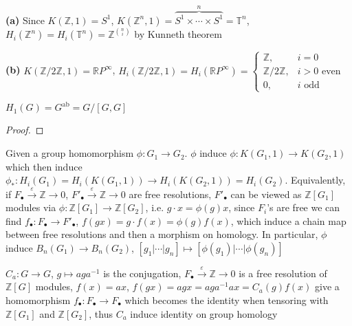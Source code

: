 \documentclass[../main.tex]{subfiles}
\begin{document}
\begin{example}
\textbf{(a) }Since $K(\mathbb Z,1)=S^1$, $K(\mathbb Z^n,1)=\overbrace{S^1\times\cdots\times S^1}^{n}=\mathbb T^n$, $H_i(\mathbb Z^n)=H_i(\mathbb T^n)=\mathbb Z^{\binom{n}{i}}$ by Kunneth theorem \par
\textbf{(b) }$K(\mathbb Z/2\mathbb Z,1)=\mathbb RP^\infty$, $H_i(\mathbb Z/2\mathbb Z,1)=H_i(\mathbb RP^\infty)=\begin{cases}
\mathbb Z, &i=0 \\
\mathbb Z/2\mathbb Z, & i>0 \text{ even} \\
0, &i\text{ odd}
\end{cases}$
\end{example}

\begin{lemma}
$H_1(G)=G^{\mathrm{ab}}=G/[G,G]$
\end{lemma}

\begin{proof}

\end{proof}

\begin{definition}
Given a group homomorphism $\phi:G_1\to G_2$. $\phi$ induce $\phi:K(G_1,1)\to K(G_2,1)$ which then induce $\phi_*:H_i(G_1)=H_i(K(G_1,1))\to H_i(K(G_2,1))=H_i(G_2)$. Equivalently, if $F_\bullet\xrightarrow{\varepsilon}\mathbb Z\to0$, $F'_\bullet\xrightarrow{\varepsilon}\mathbb Z\to0$ are free resolutions, $F'_\bullet$ can be viewed as $\mathbb Z[G_1]$ modules via $\phi:\mathbb Z[G_1]\to\mathbb Z[G_2]$, i.e. $g\cdot x=\phi(g)x$, since $F_i$'s are free we can find $f_\bullet:F_\bullet\to F'_\bullet$, $f(gx)=g\cdot f(x)=\phi(g)f(x)$, which induce a chain map between free resolutions and then a morphism on homology. In particular, $\phi$ induce $B_n(G_1)\to B_n(G_2)$, $[g_1|\cdots|g_n]\mapsto[\phi(g_1)|\cdots|\phi(g_n)]$
\end{definition}

\begin{example}
$C_a:G\to G$, $g\mapsto aga^{-1}$ is the conjugation, $F_\bullet\xrightarrow{\varepsilon}\mathbb Z\to0$ is a free resolution of $\mathbb Z[G]$ modules, $f(x)=ax$, $f(gx)=agx=aga^{-1}ax=C_a(g)f(x)$ give a homomorphism $f_\bullet:F_\bullet\to F_\bullet$ which becomes the identity when tensoring with $\mathbb Z[G_1]$ and $\mathbb Z[G_2]$, thus $C_a$ induce identity on group homology
\end{example}
\end{document}
